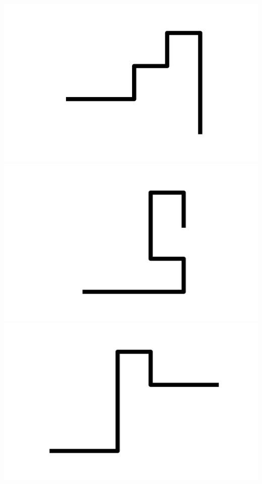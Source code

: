 \documentclass[]{report}
\begin{document}
\includegraphics[scale=.1]{pictures/21/state_cluster_shapes_157.pdf} 
\includegraphics[scale=.1]{pictures/21/state_cluster_shapes_158.pdf} 
\includegraphics[scale=.1]{pictures/21/state_cluster_shapes_159.pdf} 
\end{document}
